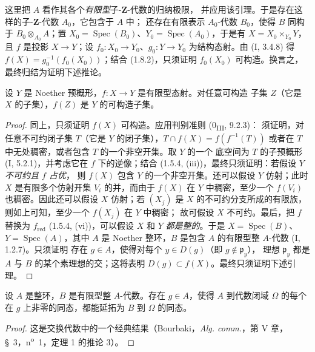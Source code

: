 这里把 $A$ 看作其各个\emph{有限型}子-$\mathbf Z$-代数的归纳极限，
并应用该引理。于是存在这样的子-$\mathbf Z$-代数 $A_0$，它包含于 $A$ 中；
还存在有限表示
$A_0$-代数 $B_0$，使得 $B$ 同构于 $B_0\otimes_{A_0}A$；置
$X_0=\operatorname{Spec}(B_0)$、$Y_0=\operatorname{Spec}(A_0)$，于是有
$X=X_0\times_{Y_0}Y$，且 $f$ 是投影 $X\to Y$；设
$f_0:X_0\to Y_0$、$g_0:Y\to Y_0$ 为结构态射。由 (I, 3.4.8) 得
$f(X)=g_0^{-1}(f_0(X_0))$；结合 (1.8.2)，只须证明 $f_0(X_0)$
可构造。换言之，最终归结为证明下述推论。

\begin{corollary}[1.8.5]
\label{IV.1.8.5-fr}
设 $Y$ 是 Noether 预概形，$f:X\to Y$ 是有限型态射。对任意可构造
子集 $Z$（它是 $X$ 的子集），$f(Z)$ 是 $Y$ 的可构造子集。
\end{corollary}


\begin{proof}
同上，只须证明 $f(X)$ 可构造。应用判别准则 (0\textsubscript{III}, 9.2.3)：
须证明，对任意不可约闭子集 $T$（它是 $Y$ 的闭子集），$T\cap f(X)=f(f^{-1}(T))$
或者在 $T$ 中无处稠密，或者包含 $T$ 的一个非空开集。取 $Y$ 的一个
底空间为 $T$ 的子预概形 (I, 5.2.1)，并考虑它在 $f$ 下的逆像；结合
(1.5.4, (iii))，最终只须证明：若假设 $Y$ \emph{不可约且 $f$ 占优}，
则 $f(X)$ 包含 $Y$ 的一个非空开集。还可以假设 $Y$ 仿射；此时 $X$
是有限多个仿射开集 $V_i$ 的并，而由于 $f(X)$ 在 $Y$ 中稠密，至少一个
$f(V_i)$ 也稠密。因此还可以假设 $X$ 仿射；若 $(X_j)$ 是 $X$
的不可约分支所成的有限族，则如上可知，至少一个 $f(X_j)$ 在 $Y$ 中稠密；
故可假设 $X$ 不可约。最后，把 $f$ 替换为 $f_{\mathrm{red}}$
(1.5.4, (vi))，可以假设 $X$ 和 $Y$ \emph{都是整的}。于是
$X=\operatorname{Spec}(B)$、$Y=\operatorname{Spec}(A)$，其中 $A$ 是
Noether 整环，$B$ 是包含 $A$ 的有限型整 $A$-代数 (I, 1.2.7)。只须证明
存在 $g\in A$，使得对每个 $y\in D(g)$（即 $g\notin\mathfrak p_y$），
理想 $\mathfrak p_y$ 都是 $A$ 与 $B$ 的某个素理想的交；这将表明
$D(g)\subset f(X)$。最终只须证明下述引理。
\end{proof}

\begin{lemma}[1.8.5.1]
\label{IV.1.8.5.1-fr}
设 $A$ 是整环，$B$ 是有限型整 $A$-代数。存在 $g\in A$，使得 $A$
到代数闭域 $\Omega$ 的每个在 $g$ 上非零的同态，都能延拓为 $B$ 到
$\Omega$ 的同态。
\end{lemma}

\begin{proof}
这是交换代数中的一个经典结果（Bourbaki，\emph{Alg. comm.}，第 V 章，
\S~3，n\textsuperscript{o}~1，定理 1 的推论 3）。
\end{proof}

